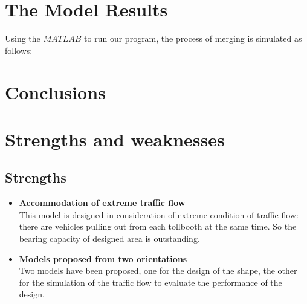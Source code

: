 \documentclass{mcmthesis}
\begin{document}
\section{The Model Results}

Using the $MATLAB$ to run our program, the process of merging is simulated as follows:





\section{Conclusions}


\section{Strengths and weaknesses}


\subsection{Strengths}
\begin{itemize}
\item \textbf{Accommodation of extreme traffic flow}\\ This model is designed in consideration of extreme condition of traffic flow: there are vehicles pulling out from each tollbooth at the same time. So the bearing capacity of designed area is outstanding.
\item \textbf{Models proposed from two orientations}\\ Two models have been proposed, one for the design of the shape, the other for the simulation of the traffic flow to evaluate the performance of the design.

\end{itemize}
\end{document}
